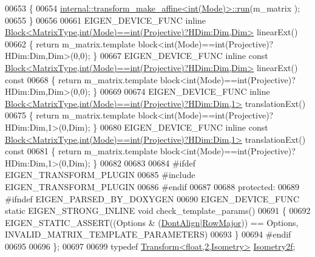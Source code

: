 \begin{DoxyCode}
00653   \{
00654     \hyperlink{struct_eigen_1_1internal_1_1transform__make__affine}{internal::transform\_make\_affine<int(Mode)>::run}(m\_matrix
      );
00655   \}
00656 
00661   EIGEN\_DEVICE\_FUNC \textcolor{keyword}{inline} 
      \hyperlink{group___core___module_class_eigen_1_1_block}{Block<MatrixType,int(Mode)==int(Projective)?HDim:Dim,Dim>}
       linearExt()
00662   \{ \textcolor{keywordflow}{return} m\_matrix.template block<int(Mode)==int(Projective)?HDim:Dim,Dim>(0,0); \}
00667   EIGEN\_DEVICE\_FUNC \textcolor{keyword}{inline} \textcolor{keyword}{const} 
      \hyperlink{group___core___module_class_eigen_1_1_block}{Block<MatrixType,int(Mode)==int(Projective)?HDim:Dim,Dim>}
       linearExt()\textcolor{keyword}{ const}
00668 \textcolor{keyword}{  }\{ \textcolor{keywordflow}{return} m\_matrix.template block<int(Mode)==int(Projective)?HDim:Dim,Dim>(0,0); \}
00669 
00674   EIGEN\_DEVICE\_FUNC \textcolor{keyword}{inline} 
      \hyperlink{group___core___module_class_eigen_1_1_block}{Block<MatrixType,int(Mode)==int(Projective)?HDim:Dim,1>}
       translationExt()
00675   \{ \textcolor{keywordflow}{return} m\_matrix.template block<int(Mode)==int(Projective)?HDim:Dim,1>(0,Dim); \}
00680   EIGEN\_DEVICE\_FUNC \textcolor{keyword}{inline} \textcolor{keyword}{const} 
      \hyperlink{group___core___module_class_eigen_1_1_block}{Block<MatrixType,int(Mode)==int(Projective)?HDim:Dim,1>}
       translationExt()\textcolor{keyword}{ const}
00681 \textcolor{keyword}{  }\{ \textcolor{keywordflow}{return} m\_matrix.template block<int(Mode)==int(Projective)?HDim:Dim,1>(0,Dim); \}
00682 
00683 
00684 \textcolor{preprocessor}{  #ifdef EIGEN\_TRANSFORM\_PLUGIN}
00685 \textcolor{preprocessor}{  #include EIGEN\_TRANSFORM\_PLUGIN}
00686 \textcolor{preprocessor}{  #endif}
00687   
00688 \textcolor{keyword}{protected}:
00689 \textcolor{preprocessor}{  #ifndef EIGEN\_PARSED\_BY\_DOXYGEN}
00690     EIGEN\_DEVICE\_FUNC \textcolor{keyword}{static} EIGEN\_STRONG\_INLINE \textcolor{keywordtype}{void} check\_template\_params()
00691     \{
00692       EIGEN\_STATIC\_ASSERT((Options & (\hyperlink{group__enums_ggaacded1a18ae58b0f554751f6cdf9eb13a40a452614141522dd313363dbbd65726}{DontAlign}|\hyperlink{group__enums_ggaacded1a18ae58b0f554751f6cdf9eb13acfcde9cd8677c5f7caf6bd603666aae3}{RowMajor})) == Options, 
      INVALID\_MATRIX\_TEMPLATE\_PARAMETERS)
00693     \}
00694 \textcolor{preprocessor}{  #endif}
00695 
00696 \};
00697 
00699 \textcolor{keyword}{typedef} \hyperlink{group___geometry___module_class_eigen_1_1_transform}{Transform<float,2,Isometry>} \hyperlink{group___geometry___module_gac031bf50068e71eac1a95b338301fc76}{Isometry2f};

\end{DoxyCode}
